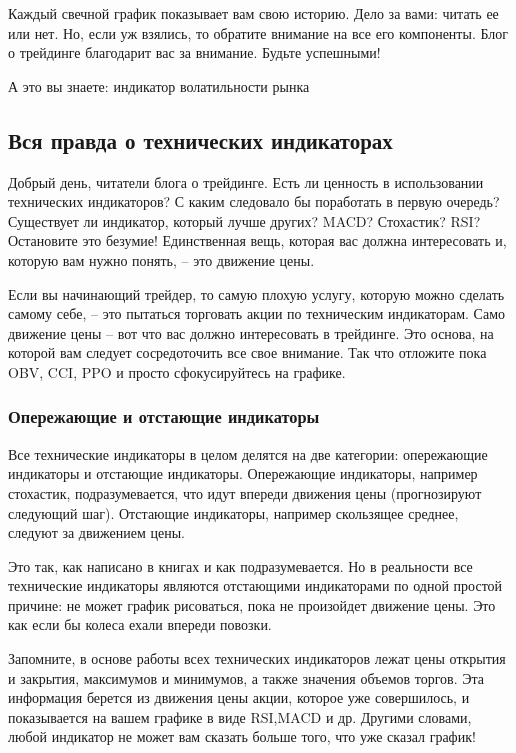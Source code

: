 \documentclass{book}
\begin{document}
Каждый свечной график показывает вам свою историю. Дело за вами: читать ее или нет. Но, если уж взялись, то обратите внимание на все его компоненты. Блог о трейдинге благодарит вас за внимание. Будьте успешными!


А это вы знаете: индикатор волатильности рынка

\subsection{Вся правда о технических индикаторах}

Добрый день, читатели блога о трейдинге. Есть ли ценность в использовании технических индикаторов? С каким следовало бы поработать в первую очередь? Существует ли индикатор, который лучше других? MACD? Стохастик? RSI? Остановите это безумие! Единственная вещь, которая вас должна интересовать и, которую вам нужно понять, – это движение цены.

Если вы начинающий трейдер, то самую плохую услугу, которую можно
сделать самому себе, – это пытаться торговать акции по техническим
индикаторам. Само движение цены – вот что вас должно интересовать в
трейдинге. Это основа, на которой вам следует сосредоточить все свое
внимание.  Так что отложите пока OBV, CCI, PPO и просто сфокусируйтесь
на графике.

\subsubsection{Опережающие и отстающие индикаторы}

Все технические индикаторы в целом делятся на две категории: опережающие индикаторы и отстающие индикаторы. Опережающие индикаторы, например стохастик, подразумевается, что идут впереди движения цены (прогнозируют следующий шаг). Отстающие индикаторы, например скользящее среднее, следуют за движением цены.

Это так, как написано в книгах и как подразумевается. Но в реальности все технические индикаторы являются отстающими индикаторами по одной простой причине: не может график рисоваться, пока не произойдет движение цены. Это как если бы колеса ехали впереди повозки.

Запомните, в основе работы всех технических индикаторов лежат цены открытия и закрытия, максимумов и минимумов, а также значения объемов торгов. Эта информация берется из движения цены акции, которое уже совершилось, и показывается на вашем графике в виде RSI,MACD и др. Другими словами, любой индикатор не может вам сказать больше того, что уже сказал график!
\end{document}
